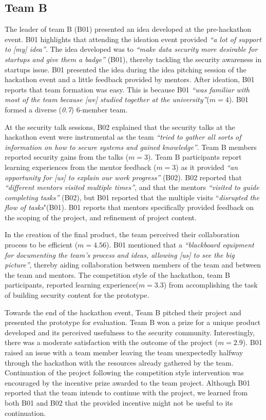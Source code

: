 \documentclass[runningheads]{llncs}
\begin{document}
\subsection{Team B}
The leader of team B (B01) presented an idea developed at the pre-hackathon event. B01 highlights that attending the ideation event provided \textit{``a lot of support to [my] idea''}. The idea developed was to \textit{``make data security more desirable for startups and give them a badge''} (B01), thereby tackling the security awareness in startups issue. B01 presented the idea during the idea pitching session of the hackathon event and a little feedback provided by mentors. After ideation, B01 reports that team formation was easy. This is because B01 \textit{``was familiar with most of the team because [we] studied together at the university''}($m = 4$). B01 formed a diverse (\textit{0.7}) 6-member team.

At the security talk sessions, B02 explained that the security talks at the hackathon event were instrumental as the team \textit{``tried to gather all sorts of information on how to secure systems and gained knowledge''}. Team B members reported security gains from the talks ($m = 3$). Team B participants report learning experiences from the mentor feedback ($m = 3$) as it provided \textit{``an opportunity for [us] to explain our work progress''} (B02). B02 reported that \textit{``different mentors visited multiple times''}, and that the mentors  \textit{``visited to guide completing tasks''} (B02), but B01 reported that the multiple visits ``\textit{disrupted the flow of tasks}"(B01). B01 reports that mentors specifically provided feedback on the scoping of the project, and refinement of project content. %

In the creation of the final product, the team perceived their collaboration process to be efficient ($m = 4.56$). B01 mentioned that a \textit{``blackboard equipment for documenting the team's process and ideas, allowing [us] to see the big picture''}, thereby aiding collaboration between members of the team and between the team and mentors. 
The competition style of the hackathon, team B participants, reported learning experience($m = 3.3$) from accomplishing the task of building security content for the prototype.

Towards the end of the hackathon event, Team B pitched their project and presented the prototype for evaluation. Team B won a prize for a unique product developed and its perceived usefulness to the security community. Interestingly, there was a moderate satisfaction with the outcome of the project ($m = 2.9$). B01 raised an issue with a team member leaving the team unexpectedly halfway through the hackathon with the resources already gathered by the team. Continuation of the project following the competition style intervention was encouraged by the incentive prize awarded to the team project. Although B01 reported that the team intends to continue with the project, we learned from both B01 and B02 that the provided incentive might not be useful to its continuation.
\end{document}
